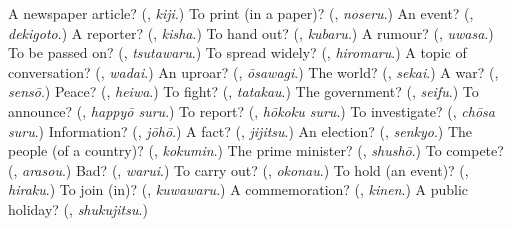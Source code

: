 \begin{tcolorbox}[breakable,colback=teal!4,colframe=teal!35!black,title={Before you move on}]
A newspaper article? (\textbf{}, \emph{kiji}.) To print (in a paper)? (\textbf{}, \emph{noseru}.) An event? (\textbf{}, \emph{dekigoto}.) A reporter? (\textbf{}, \emph{kisha}.) To hand out? (\textbf{}, \emph{kubaru}.) A rumour? (\textbf{}, \emph{uwasa}.) To be passed on? (\textbf{}, \emph{tsutawaru}.) To spread widely? (\textbf{}, \emph{hiromaru}.) A topic of conversation? (\textbf{}, \emph{wadai}.) An uproar? (\textbf{}, \emph{ōsawagi}.) The world? (\textbf{}, \emph{sekai}.) A war? (\textbf{}, \emph{sensō}.) Peace? (\textbf{}, \emph{heiwa}.) To fight? (\textbf{}, \emph{tatakau}.) The government? (\textbf{}, \emph{seifu}.) To announce? (\textbf{}, \emph{happyō suru}.) To report? (\textbf{}, \emph{hōkoku suru}.) To investigate? (\textbf{}, \emph{chōsa suru}.) Information? (\textbf{}, \emph{jōhō}.) A fact? (\textbf{}, \emph{jijitsu}.) An election? (\textbf{}, \emph{senkyo}.) The people (of a country)? (\textbf{}, \emph{kokumin}.) The prime minister? (\textbf{}, \emph{shushō}.) To compete? (\textbf{}, \emph{arasou}.) Bad? (\textbf{}, \emph{warui}.) To carry out? (\textbf{}, \emph{okonau}.) To hold (an event)? (\textbf{}, \emph{hiraku}.) To join (in)? (\textbf{}, \emph{kuwawaru}.) A commemoration? (\textbf{}, \emph{kinen}.) A public holiday? (\textbf{}, \emph{shukujitsu}.)
\end{tcolorbox}
